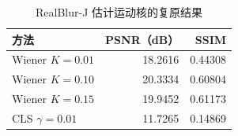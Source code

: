 \begin{table}[htbp]
\centering
\caption{RealBlur-J 估计运动核的复原结果}
\label{tab:radon}
\begin{tabular}{lrr}
\toprule
方法 & PSNR（dB） & SSIM \\
\midrule
Wiener $K=0.01$ & 18.2616 & 0.44308 \\
Wiener $K=0.10$ & 20.3334 & 0.60804 \\
Wiener $K=0.15$ & 19.9452 & 0.61173 \\
CLS $\gamma=0.01$ & 11.7265 & 0.14869 \\
\bottomrule
\end{tabular}
\end{table}
